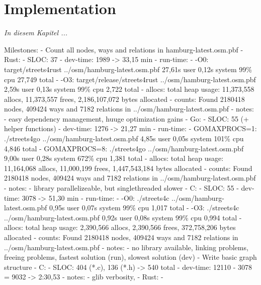\chapter{Implementation}
\label{chap:Implementation}

\textit{%
In diesem Kapitel ...
}
\bigskip


Milestones:
    - Count all nodes, ways and relations in hamburg-latest.osm.pbf
        - Rust:
            - SLOC: 37
            - dev-time: 1989 -> 33,15 min
            - run-time:
                - -O0: target/streets4rust ../osm/hamburg-latest.osm.pbf  27,61s user 0,12s system 99\% cpu 27,749 total
                - -O3: target/release/streets4rust ../osm/hamburg-latest.osm.pbf  2,59s user 0,13s system 99\% cpu 2,722 total
            - allocs: total heap usage: 11,373,558 allocs, 11,373,557 frees, 2,186,107,072 bytes allocated
            - counts: Found 2180418 nodes, 409424 ways and 7182 relations in ../osm/hamburg-latest.osm.pbf
            - notes:
                - easy dependency management, huuge optimization gains
        - Go:
            - SLOC: 55 (+ helper functions)
            - dev-time: 1276 -> 21,27 min
            - run-time:
                - GOMAXPROCS=1: ./streets4go ../osm/hamburg-latest.osm.pbf  4,85s user 0,05s system 101\% cpu 4,846 total
                - GOMAXPROCS=8: ./streets4go ../osm/hamburg-latest.osm.pbf  9,00s user 0,28s system 672\% cpu 1,381 total
            - allocs: total heap usage: 11,164,068 allocs, 11,000,199 frees, 1,447,543,184 bytes allocated
            - counts: Found 2180418 nodes, 409424 ways and 7182 relations in ../osm/hamburg-latest.osm.pbf
            - notes:
                - library parallelizeable, but singlethreaded slower
        - C:
            - SLOC: 55
            - dev-time: 3078 -> 51,30 min
            - run-time:
                - -O0: ./streets4c ../osm/hamburg-latest.osm.pbf  0,95s user 0,07s system 99\% cpu 1,017 total
                - -O3: ./streets4c ../osm/hamburg-latest.osm.pbf  0,92s user 0,08s system 99\% cpu 0,994 total
            - allocs: total heap usage: 2,390,566 allocs, 2,390,566 frees, 372,758,206 bytes allocated
            - counts: Found 2180418 nodes, 409424 ways and 7182 relations in ../osm/hamburg-latest.osm.pbf
            - notes:
                - no library available, linking problems, freeing problems, fastest solution (run), slowest solution (dev)
    - Write basic graph structure
        - C:
            - SLOC: 404 (*.c), 136 (*.h) -> 540 total
            - dev-time: 12110 - 3078 = 9032 -> 2:30,53
            - notes:
                - glib verbosity, 
        - Rust:
            -

